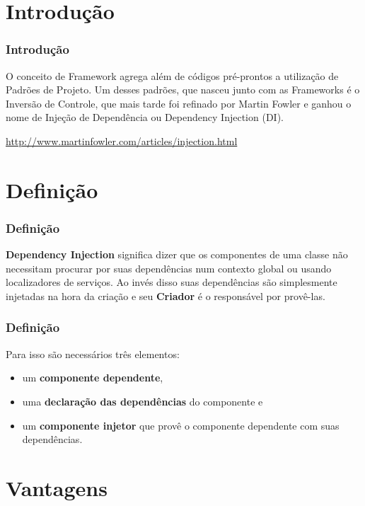 \section{Introdução}

\begin{frame}[fragile]\frametitle{Introdução}

O conceito de Framework agrega além de códigos pré-prontos a utilização
de Padrões de Projeto. Um desses padrões, que nasceu junto com as
Frameworks é o Inversão de Controle, que mais tarde foi refinado por
Martin Fowler e ganhou o nome de Injeção de Dependência ou Dependency
Injection (DI).

\bigskip

\url{http://www.martinfowler.com/articles/injection.html}

\end{frame}

\section{Definição}

\begin{frame}\frametitle{Definição}

\textbf{Dependency Injection} significa dizer que os componentes de uma
classe não necessitam procurar por suas dependências num contexto global
ou usando localizadores de serviços. Ao invés disso suas dependências
são simplesmente injetadas na hora da criação e seu \textbf{Criador} é o
responsável por provê-las.

\end{frame}

\begin{frame}\frametitle{Definição}

Para isso são necessários três elementos:

\begin{itemize}
\item
  um \textbf{componente dependente},
\item
  uma \textbf{declaração das dependências} do componente e
\item
  um \textbf{componente injetor} que provê o componente dependente com
  suas dependências.
\end{itemize}
\end{frame}

\section{Vantagens}

